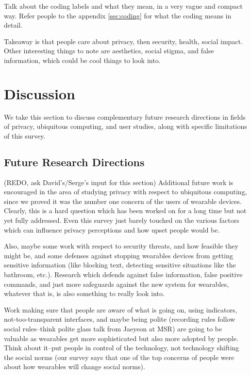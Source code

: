\documentclass{acm_proc_article-sp}
\begin{document}
Talk about the coding labels and what they mean, in a very vague and compact way. Refer people to the appendix \ref{sec:coding} for what the coding means in detail. 

Takeaway is that people care about privacy, then security, health, social impact. Other interesting things to note are aesthetics, social stigma, and false information, which could be cool things to look into. 


\section{Discussion}
We take this section to discuss complementary future research directions in fields of privacy, ubiquitous computing, and user studies, along with specific limitations of this survey. 

\subsection{Future Research Directions}
(REDO, ask David's/Serge's input for this section) Additional future work is encouraged in the area of studying privacy with respect to ubiquitous computing, since we proved it was the number one concern of the users of wearable devices. Clearly, this is a hard question which has been worked on for a long time but not yet fully addressed. Even this survey just barely touched on the various factors which can influence privacy perceptions and how upset people would be. 

 Also, maybe some work with respect to security threats, and how feasible they might be, and some defenses against stopping wearables devices from getting sensitive information (like blocking text, detecting sensitive situations like the bathroom, etc.). Research which defends against false information, false positive commands, and just more safeguards against the new system for wearables, whatever that is, is also something to really look into. 
 
 Work making sure that people are aware of what is going on, using indicators, not-too-transparent interfaces, and maybe being polite (recording rules follow social rules--think polite glass talk from Jaeyeon at MSR) are going to be valuable as wearables get more sophisticated but also more adopted by people. Think about it--put people in control of the technology, not technology shifting the social norms (our survey says that one of the top concerns of people were about how wearables will change social norms). 
\end{document}
